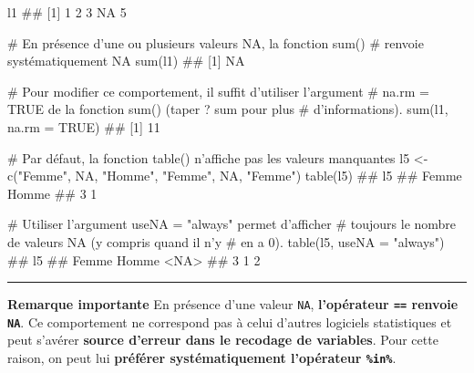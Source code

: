 \documentclass[12pt,twosided, notitlepage]{book}
\newenvironment{Shaded}{}{}
\newcommand{\KeywordTok}[1]{\textcolor[rgb]{0.00,0.00,1.00}{#1}}
\newcommand{\DataTypeTok}[1]{#1}
\newcommand{\StringTok}[1]{\textcolor[rgb]{0.00,0.50,0.50}{#1}}
\newcommand{\CommentTok}[1]{\textcolor[rgb]{0.00,0.50,0.00}{#1}}
\newcommand{\OtherTok}[1]{\textcolor[rgb]{1.00,0.25,0.00}{#1}}
\newcommand{\OperatorTok}[1]{#1}
\newcommand{\NormalTok}[1]{#1}
\renewenvironment{Shaded}{\begin{snugshade}}{\end{snugshade}}
\begin{document}
\begin{Shaded}
\begin{Highlighting}[]
\NormalTok{l1}
\NormalTok{  ## [1]  1  2  3 NA  5}

\CommentTok{# En présence d'une ou plusieurs valeurs NA, la fonction sum() }
\CommentTok{# renvoie systématiquement NA}
\KeywordTok{sum}\NormalTok{(l1)}
\NormalTok{  ## [1] NA}

\CommentTok{# Pour modifier ce comportement, il suffit d'utiliser l'argument }
\CommentTok{# na.rm = TRUE de la fonction sum() (taper ? sum pour plus }
\CommentTok{# d'informations).}
\KeywordTok{sum}\NormalTok{(l1, }\DataTypeTok{na.rm =} \OtherTok{TRUE}\NormalTok{)}
\NormalTok{  ## [1] 11}

\CommentTok{# Par défaut, la fonction table() n'affiche pas les valeurs manquantes}
\NormalTok{l5 <-}\StringTok{ }\KeywordTok{c}\NormalTok{(}\StringTok{"Femme"}\NormalTok{, }\OtherTok{NA}\NormalTok{, }\StringTok{"Homme"}\NormalTok{, }\StringTok{"Femme"}\NormalTok{, }\OtherTok{NA}\NormalTok{, }\StringTok{"Femme"}\NormalTok{)}
\KeywordTok{table}\NormalTok{(l5)}
\NormalTok{  ## l5}
\NormalTok{  ## Femme Homme }
\NormalTok{  ##     3     1}

\CommentTok{# Utiliser l'argument useNA = "always" permet d'afficher}
\CommentTok{# toujours le nombre de valeurs NA (y compris quand il n'y}
\CommentTok{# en a 0).}
\KeywordTok{table}\NormalTok{(l5, }\DataTypeTok{useNA =} \StringTok{"always"}\NormalTok{)}
\NormalTok{  ## l5}
\NormalTok{  ## Femme Homme  <NA> }
\NormalTok{  ##     3     1     2}
\end{Highlighting}
\end{Shaded}

\begin{center}\rule{0.5\linewidth}{\linethickness}\end{center}

\textbf{Remarque importante} En présence d'une valeur \texttt{NA},
\textbf{l'opérateur \texttt{==} renvoie \texttt{NA}}\index{\texttt{==}}.
Ce comportement ne correspond pas à celui d'autres logiciels
statistiques et peut s'avérer \textbf{source d'erreur dans le recodage
de variables}. Pour cette raison, on peut lui \textbf{préférer
systématiquement l'opérateur \texttt{\%in\%}}.

\begin{Shaded}
\end{Shaded}
\end{document}
